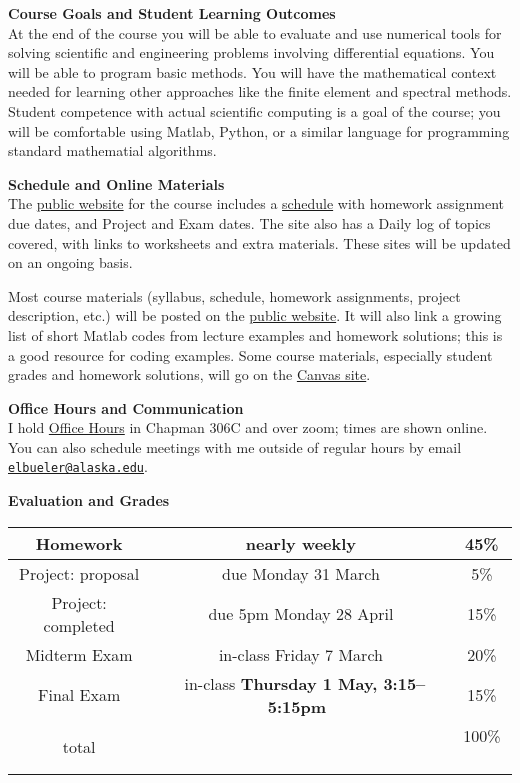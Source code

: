 \documentclass[12pt]{article}
\renewcommand{\emph}[1]{\textsf{\textbf{#1}}}
\newcommand{\localhead}[1]{\par\smallskip\textbf{#1} \smallskip\nobreak\\}%
\def\heading#1{\localhead{\large\emph{#1}}}
\begin{document}
\clearpage\newpage
\phantom{x}\vspace{-3mm}

\heading{Course Goals and Student Learning Outcomes}
At the end of the course you will be able to evaluate and use numerical tools for solving scientific and engineering problems involving differential equations.  You will be able to program basic methods.  You will have the mathematical context needed for learning other approaches like the finite element and spectral methods.  Student competence with actual scientific computing is a goal of the course; you will be comfortable using Matlab, Python, or a similar language for programming standard mathematial algorithms.


\heading{Schedule and Online Materials}
The \href{https://bueler.github.io/nade/}{public website} for the course includes a \href{https://bueler.github.io/nade/assets/general/S25/schedule.pdf}{schedule} with homework assignment due dates, and Project and Exam dates.  The site also has a Daily log of topics covered, with links to worksheets and extra materials.  These sites will be updated on an ongoing basis.

Most course materials (syllabus, schedule, homework assignments, project description, etc.) will be posted on the \href{https://bueler.github.io/nade/}{public website}.  It will also link a growing list of short Matlab codes from lecture examples and homework solutions; this is a good resource for coding examples.  Some course materials, especially student grades and homework solutions, will go on the \href{https://canvas.alaska.edu/courses/24194}{Canvas site}.


\heading{Office Hours and Communication}
I hold \href{http://bueler.github.io/OffHrs.htm}{Office Hours} in Chapman 306C and over zoom; times are shown online.  You can also schedule meetings with me outside of regular hours by email \href{mailto:elbueler@alaska.edu}{\texttt{elbueler@alaska.edu}}.

\medskip
\heading{Evaluation and Grades}
\vskip -10pt

\begin{tabular}{|c|c|c|}
\hline
Homework & nearly weekly & 45\% \\
\hline
Project: proposal & due Monday 31 March & 5\%  \\
\hline
Project: completed & due 5pm Monday 28 April & 15\%  \\
\hline
Midterm Exam & in-class Friday 7 March & 20\%  \\
\hline
Final Exam & \, in-class \emph{Thursday 1 May, 3:15--5:15pm} \, & 15\% \\
\hline
total & & 100\% \, \\
\hline
\end{tabular}
\end{document}
